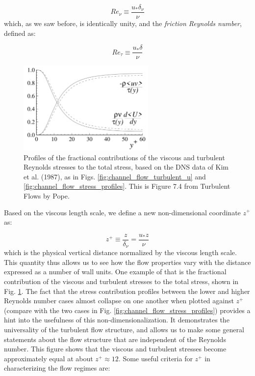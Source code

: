 \documentclass[12pt]{article}
\numberwithin{equation}{section}
\numberwithin{figure}{section}
\numberwithin{table}{section}
\begin{document}
\begin{equation}
  Re_\nu \equiv \frac{u_* \delta_\nu}{\nu}
\end{equation}
which, as we saw before, is identically unity,
and the \textit{friction Reynolds number}, defined as:

\begin{equation}
  Re_\tau \equiv \frac{u_* \delta}{\nu}
\end{equation}

\begin{figure}[h]
  \centering
  \includegraphics[width=0.6\textwidth]{assets/fig_channel_flow_stress_fractions.png}
  \caption{
    Profiles of the fractional contributions of the viscous and turbulent
    Reynolds stresses to the total stress, based on the DNS data of Kim et al.
    (1987), as in Figs. \ref{fig:channel_flow_turbulent_u} and
    \ref{fig:channel_flow_stress_profiles}.
    This is Figure 7.4 from Turbulent Flows by Pope.
  }
  \label{fig:channel_flow_stress_fractions}
\end{figure}

Based on the viscous length scale, we define a new non-dimensional coordinate
$z^+$ as:

\begin{equation}
  z^+ \equiv \frac{z}{\delta_\nu} = \frac{u_* z}{\nu}
\end{equation}
which is the physical vertical distance normalized by the viscous length scale.
This quantity thus allows us to see how the flow properties vary with the 
distance expressed as a number of wall units.
One example of that is the fractional contribution of the viscous and turbulent
stresses to the total stress, shown in Fig. \ref{fig:channel_flow_stress_fractions}.
The fact that the stress contribution profiles between the lower and higher
Reynolds number cases almost collapse on one another when plotted against $z^+$
(compare with the two cases in Fig. \ref{fig:channel_flow_stress_profiles})
provides a hint into the usefulness of this non-dimensionalization.
It demonstrates the universality of the turbulent flow structure, and allows us
to make some general statements about the flow structure that are independent of
the Reynolds number.
This figure shows that the viscous and turbulent stresses become approximately
equal at about $z^+ \approx 12$.
Some useful criteria for $z^+$ in characterizing the flow regimes are:
\end{document}
